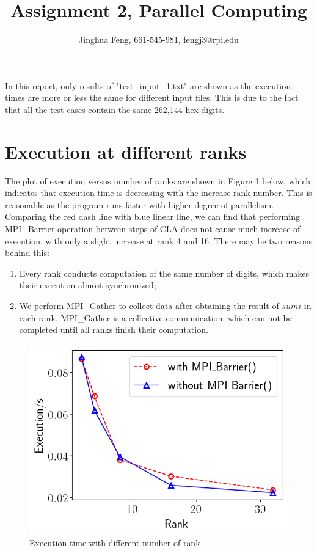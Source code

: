 \documentclass{article}
\title{Assignment 2, Parallel Computing}
\author{Jinghua Feng, 661-545-981, fengj3@rpi.edu}
\begin{document}
\maketitle
In this report, only results of "test\_input\_1.txt" are shown as the execution times are more or less the same for different input files. This is due to the fact that all the test cases contain the same 262,144 hex digits.
\section{Execution at different ranks}
The plot of execution versus number of ranks are shown in Figure 1 below, which indicates that execution time is decreasing with the increase rank number. This is reasonable as the program runs faster with higher degree of parallelism. Comparing the red dash line with blue linear line, we can find that performing MPI\_Barrier operation between steps of CLA does not cause much increase of execution, with only a slight increase at rank 4 and 16. There may be two reasons behind this:
\begin{enumerate}[label=(\alph*)]
	\item Every rank conducts computation of the same number of digits, which makes their execution almost synchronized;
	\item We perform MPI\_Gather to collect data after obtaining the result of $sumi$ in each rank. MPI\_Gather is a collective communication, which can not be completed until all ranks finish their computation.
\end{enumerate}

\begin{figure}[!htb]
	\centering
	\includegraphics[scale=0.5]{../plot/exe_vs_rank.png}
	\caption{Execution time with different number of rank}
\end{figure}
\end{document}
